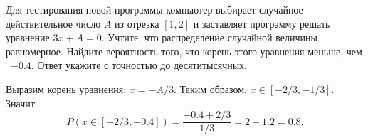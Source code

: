 
Для тестирования новой программы компьютер выбирает случайное действительное число $A$ из отрезка $[1, 2]$ и заставляет программу решать уравнение \linebreak $3x + A = 0$. Учтите, что распределение случайной величины равномерное. Найдите вероятность того, что корень этого уравнения меньше, чем  $-0.4$. Ответ укажите с точностью до десятитысячных.

\solutionSection

Выразим корень уравнения: $x = -A/3$. Таким образом, $x \in [-2/3, -1/3]$. Значит $$P(x \in [-2/3, -0.4]) = \frac{-0.4+2/3}{1/3} = 2 - 1.2 = 0.8.$$

